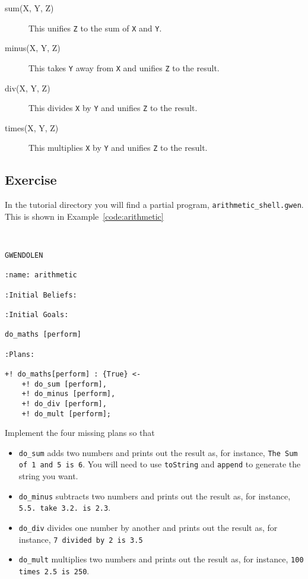 \begin{description}
\item[sum(X, Y, Z)] This unifies \lstinline{Z} to the sum of \lstinline{X} and \lstinline{Y}.
\item[minus(X, Y, Z)] This takes \lstinline{Y} away from \lstinline{X} and unifies \lstinline{Z} to the result.
\item[div(X, Y, Z)] This divides \lstinline{X} by \lstinline{Y} and unifies \lstinline{Z} to the result.
\item[times(X, Y, Z)] This multiplies \lstinline{X} by \lstinline{Y} and unifies \lstinline{Z} to the result.
\end{description}

\subsection{Exercise}
In the tutorial directory you will find a partial program, \texttt{arithmetic\_shell.gwen}.  This is shown in Example~\ref{code:arithmetic}

\begin{ourexample}
\label{code:arithmetic} \quad \\
\begin{lstlisting}[basicstyle=\sffamily,style=easslisting,language=Gwendolen]
GWENDOLEN

:name: arithmetic

:Initial Beliefs:

:Initial Goals:

do_maths [perform]

:Plans:
	
+! do_maths[perform] : {True} <-
	+! do_sum [perform],
	+! do_minus [perform],
	+! do_div [perform],
	+! do_mult [perform];
\end{lstlisting}
\end{ourexample}

Implement the four missing plans so that
\begin{itemize}
\item \lstinline{do_sum} adds two numbers and prints out the result as, for instance, \texttt{The Sum of 1 and 5 is 6}.  You will need to use \texttt{toString} and \texttt{append} to generate the string you want.
\item \lstinline{do_minus} subtracts two numbers and prints out the result as, for instance, \texttt{5.5. take 3.2. is 2.3}.
\item \lstinline{do_div} divides one number by another and prints out the result as, for instance, \texttt{7 divided by 2 is 3.5}
\item \lstinline{do_mult} multiplies two numbers and prints out the result as, for instance, \texttt{100 times 2.5 is 250}.
\end{itemize}

